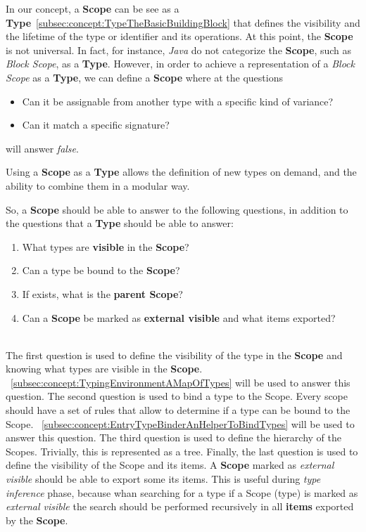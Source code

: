In our concept, a \textbf{Scope} can be see as a \textbf{Type}~\ref{subsec:concept:TypeTheBasicBuildingBlock} that defines the visibility and the lifetime of the type or identifier and its operations. At this point, the \textbf{Scope} is not universal. In fact, for instance, \textit{Java} do not categorize the \textbf{Scope}, such as \textit{Block Scope}, as a \textbf{Type}. However, in order to achieve a representation of a \textit{Block Scope} as a \textbf{Type}, we can define a \textbf{Scope} where at the questions

\begin{itemize}
    \item Can it be assignable from another type with a specific kind of variance?
    \item Can it match a specific signature?
\end{itemize}

will answer \textit{false}.

Using a \textbf{Scope} as a \textbf{Type} allows the definition of new types on demand, and the ability to combine them in a modular way.

So, a \textbf{Scope} should be able to answer to the following questions, in addition to the questions that a \textbf{Type} should be able to answer:

\begin{enumerate}
    \item What types are \textbf{visible} in the \textbf{Scope}?
    \item Can a type be bound to the \textbf{Scope}?
    \item If exists, what is the \textbf{parent Scope}?
    \item Can a \textbf{Scope} be marked as \textbf{external visible} and what items exported?
\end{enumerate}
\\
The first question is used to define the visibility of the type in the \textbf{Scope} and knowing what types are visible in the \textbf{Scope}. ~\ref{subsec:concept:TypingEnvironmentAMapOfTypes} will be used to answer this question.
The second question is used to bind a type to the Scope. Every scope should have a set of rules that allow to determine if a type can be bound to the Scope. ~\ref{subsec:concept:EntryTypeBinderAnHelperToBindTypes} will be used to answer this question.
The third question is used to define the hierarchy of the Scopes. Trivially, this is represented as a tree.
Finally, the last question is used to define the visibility of the Scope and its items. A \textbf{Scope} marked as \textit{external visible} should be able to export some its items. This is useful during \textit{type inference} phase, because whan searching for a type if a Scope (type) is marked as \textit{external visible} the search should be performed recursively in all \textbf{items} exported by the \textbf{Scope}.

